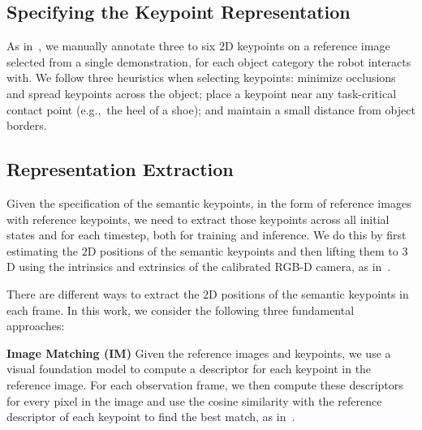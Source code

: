 \documentclass[letterpaper, 10 pt, conference]{ieeeconf}  %
\begin{document}
\subsection{Specifying the Keypoint Representation}
\label{sec:method-representation-specification}
As in~\cite{Levy2025P3PO,haldar2025pointpolicy}, we manually annotate three to six $2$D keypoints on a reference image selected from a single demonstration, for each object category the robot interacts with. We follow three heuristics when selecting keypoints: minimize occlusions and spread keypoints across the object; place a keypoint near any task-critical contact point (e.g.,\ the heel of a shoe); and maintain a small distance from object borders. %

\subsection{Representation Extraction}
\label{sec:method-representation-extraction}
Given the specification of the semantic keypoints, in the form of reference images with reference keypoints, we need to extract those keypoints across all initial states and for each timestep, both for training and inference.  We do this by first estimating the $2$D positions of the semantic keypoints and then lifting them to $3$D using the intrinsics and extrinsics of the calibrated RGB-D camera, as in~\cite{wang2025skil,Levy2025P3PO,di2024KAT}. %

There are different ways to extract the $2$D positions of the semantic keypoints in each frame. In this work, we consider the following three fundamental approaches:

\textbf{Image Matching (IM)}
Given the reference images and keypoints, we use a visual foundation model to compute a descriptor for each keypoint in the reference image. For each observation frame, we then compute these descriptors for every pixel in the image and use the cosine similarity with the reference descriptor of each keypoint to find the best match, as in~\cite{wang2025skil,di2024KAT}.
\end{document}
